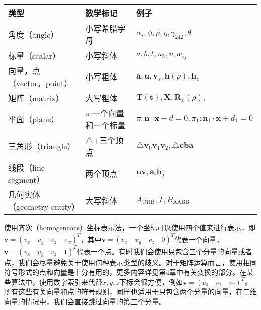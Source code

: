 \documentclass[
  paper=a4,
  ,captions=tableheading
]{scrartcl}
\begin{document}
\begin{longtable}[]{@{}
  >{\raggedright\arraybackslash}p{}
  >{\raggedright\arraybackslash}p{}
  >{\raggedright\arraybackslash}p{}@{}}
\toprule\noalign{}
\begin{minipage}[b]{\linewidth}\raggedright
\textbf{类型}
\end{minipage} & \begin{minipage}[b]{\linewidth}\raggedright
\textbf{数学标记}
\end{minipage} & \begin{minipage}[b]{\linewidth}\raggedright
\textbf{例子}
\end{minipage} \\
\midrule\noalign{}
\endhead
\bottomrule\noalign{}
\endlastfoot
角度（angle） & 小写希腊字母 &
\(\alpha_i, \phi, \rho, \eta, \gamma_{242}, \theta\) \\
标量（scalar） & 小写斜体 & \(a, b, t, u_k, v, w_{ij}\) \\
向量，点（vector，point） & 小写粗体 &
\(\mathbf{a}, \mathbf{u}, \mathbf{v}_s, \mathbf{h}(\rho), \mathbf{h}_z\) \\
矩阵（matrix） & 大写粗体 &
\(\mathbf{T(t)}, \mathbf{X}, \mathbf{R}_x(\rho),\) \\
平面（plane） & \(\pi\):一个向量和一个标量 &
\(\pi :\mathbf{n} \cdot \mathbf{x} + d = 0,  \pi_1 :\mathbf{n}_1 \cdot \mathbf{x} + d_1 = 0\) \\
三角形（triangle） & \(\triangle\)+三个顶点 &
\(\triangle \mathbf{v}_0 \mathbf{v}_1 \mathbf{v}_2, \triangle \mathbf{cba}\) \\
线段（line segment） & 两个顶点 &
\(\mathbf{uv}, \mathbf{a}_i \mathbf{b}_j\) \\
几何实体（geometry entity） & 大写斜体 & \(A_{\text{OBB}}, T, B_{\text{AABB}}\) \\
\end{longtable}

使用齐次（homogeneous）坐标表示法，一个坐标可以使用四个值来进行表示，即\(\mathbf{v} =(v_x \quad v_y \quad v_z \quad v_w)^T\)，其中\(\mathbf{v} =(v_x \quad v_y \quad v_z \quad 0)^T\)代表一个向量，\(\mathbf{v} =(v_x \quad v_y \quad v_z \quad 1)^T\)代表一个点。有时我们会使用只包含三个分量的向量或者点，我们会尽量避免关于使用何种表示类型的歧义。对于矩阵运算而言，使用相同符号形式的点和向量是十分有用的，更多内容详见第4章中有关变换的部分。在某些算法中，使用数字索引来代替\(x, y, z\)下标会很方便，例如\(\mathbf{v} =(v_0 \quad v_1 \quad v_2)^T\)。所有这些有关向量和点的符号规则，同样也适用于只包含两个分量的向量，在二维向量的情况中，我们会直接跳过向量的第三个分量。
\end{document}
